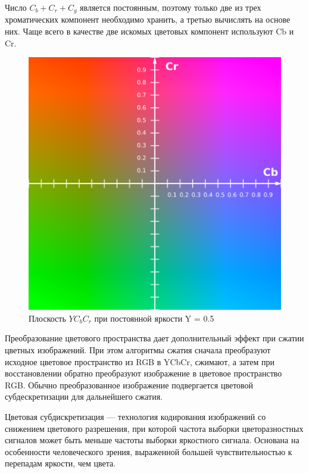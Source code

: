 Число $C_b+C_r+C_g$ является постоянным, поэтому только две из трех хроматических компонент необходимо хранить, а третью вычислять на основе них. Чаще всего в качестве две искомых цветовых компонент используют Cb и Cr. 

\begin{figure}[H]
	\begin{center}
		\includegraphics[scale=0.5]{pics/YCbCr/YCbCr.png}
		\caption{Плоскость $YC_bC_r$ при постоянной яркости Y = 0.5} 
		\label{pic:YCbCr:separation}
	\end{center}
\end{figure}

Преобразование цветового пространства дает дополнительный эффект при сжатии цветных изображений. При этом алгоритмы сжатия сначала преобразуют исходное цветовое пространство из RGB в YCbCr, сжимают, а затем при восстановлении обратно преобразуют изображение в цветовое пространство RGB. Обычно преобразованное изображение подвергается цветовой субдескретизации для дальнейшего сжатия.

Цветовая субдискретизация — технология кодирования изображений со снижением цветового разрешения, при которой частота выборки цветоразностных сигналов может быть меньше частоты выборки яркостного сигнала. Основана на особенности человеческого зрения, выраженной большей чувствительностью к перепадам яркости, чем цвета. 

